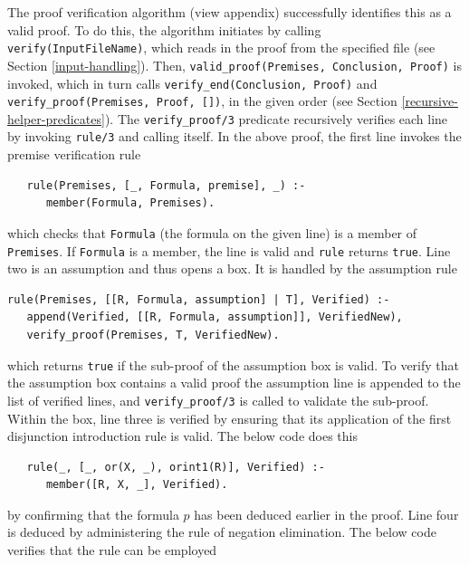 \documentclass[a4paper, 11pt]{article}
\begin{document}
   The proof verification algorithm (view appendix)
   successfully identifies this as a valid proof. To do this,
   the algorithm initiates by calling \\
   \texttt{verify(InputFileName)}, which reads in the proof 
   from the specified file (see Section \ref{input-handling}).
   Then, \texttt{valid\_proof(Premises, Conclusion, Proof)} 
   is invoked, which in turn calls
   \texttt{verify\_end(Conclusion, Proof)} and \\
   \texttt{verify\_proof(Premises, Proof, [])}, in the given 
   order (see Section \ref{recursive-helper-predicates}).
   The \texttt{verify\_proof/3} predicate recursively
   verifies each line by invoking \texttt{rule/3} and
   calling itself. In the above proof, the first
   line invokes the premise verification rule

\begin{verbatim}
   rule(Premises, [_, Formula, premise], _) :-
      member(Formula, Premises).
\end{verbatim}
                    
   which checks that \texttt{Formula} (the formula
   on the given line) is a member of
   \texttt{Premises}. If \texttt{Formula} is a
   member, the line is valid and \texttt{rule} returns
   \texttt{true}. Line two is an assumption and thus 
   opens a box. It is handled by the assumption rule

\begin{verbatim}
rule(Premises, [[R, Formula, assumption] | T], Verified) :-
   append(Verified, [[R, Formula, assumption]], VerifiedNew),
   verify_proof(Premises, T, VerifiedNew).
\end{verbatim}

   which returns \texttt{true} if the sub-proof of the
   assumption box is valid. To verify that the
   assumption box contains a valid proof the
   assumption line is appended to the list of
   verified lines, and \texttt{verify\_proof/3} is
   called to validate the sub-proof. Within the box,
   line three is verified by ensuring that its
   application of the first disjunction introduction
   rule is valid. The below code does this

\begin{verbatim}
   rule(_, [_, or(X, _), orint1(R)], Verified) :-
      member([R, X, _], Verified).
\end{verbatim}

   by confirming that the formula $p$ has been
   deduced earlier in the proof. Line four is deduced
   by administering the rule of negation elimination.
   The below code verifies that the rule can be
   employed
\end{document}
